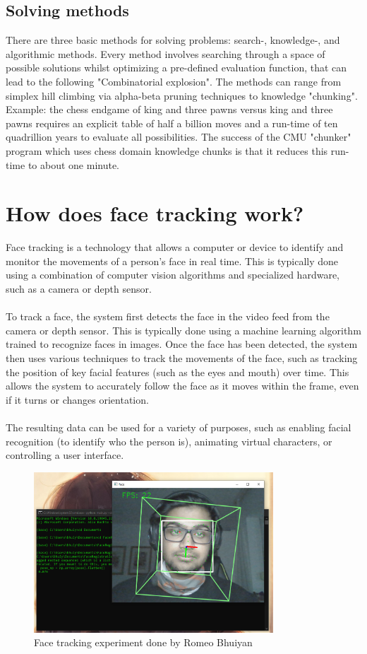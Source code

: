 \subsection{Solving methods}
There are three basic methods for solving problems: search-, knowledge-, and algorithmic methods. Every method involves searching through a space of possible solutions whilst optimizing a pre-defined evaluation function, that can lead to the following "Combinatorial explosion". The methods can range from simplex hill climbing via alpha-beta pruning techniques to knowledge "chunking". 
Example: the chess endgame of king and three pawns versus king and three pawns requires an explicit table of half a billion moves and a run-time of ten quadrillion years to evaluate all possibilities. The success of the CMU "chunker" program which uses chess domain knowledge chunks is that it reduces this run-time to about one minute.

\section{How does face tracking work?}
Face tracking is a technology that allows a computer or device to identify and monitor the movements of a person's face in real time. This is typically done using a combination of computer vision algorithms and specialized hardware, such as a camera or depth sensor.
\\
\\
To track a face, the system first detects the face in the video feed from the camera or depth sensor. This is typically done using a machine learning algorithm trained to recognize faces in images. Once the face has been detected, the system then uses various techniques to track the movements of the face, such as tracking the position of key facial features (such as the eyes and mouth) over time. This allows the system to accurately follow the face as it moves within the frame, even if it turns or changes orientation.
\\
\\
The resulting data can be used for a variety of purposes, such as enabling facial recognition (to identify who the person is), animating virtual characters, or controlling a user interface.
\\
\begin{figure}[htb]
    \centering
    \includegraphics[width=0.8\textwidth]{pics/bhuiyanfracetracking.png}
    \caption{Face tracking experiment done by Romeo Bhuiyan}
\end{figure}


